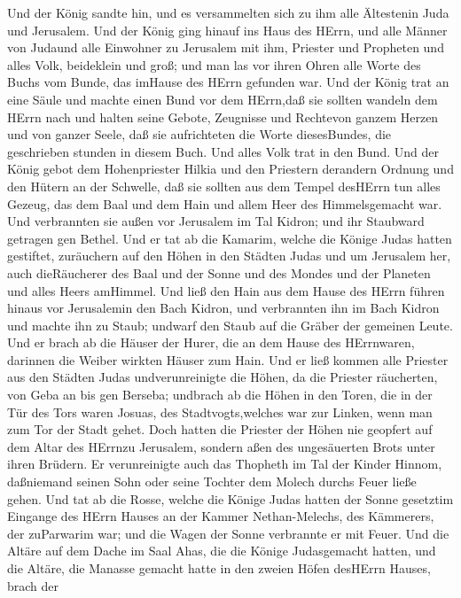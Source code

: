  Und der König sandte hin, und es versammelten sich zu ihm
alle Ältestenin Juda und Jerusalem.  Und der König ging
hinauf ins Haus des HErrn, und alle Männer von Judaund alle Einwohner zu
Jerusalem mit ihm, Priester und Propheten und alles Volk, beideklein und
groß; und man las vor ihren Ohren alle Worte des Buchs vom Bunde, das
imHause des HErrn gefunden war.  Und der König trat an eine
Säule und machte einen Bund vor dem HErrn,daß sie sollten wandeln dem
HErrn nach und halten seine Gebote, Zeugnisse und Rechtevon ganzem
Herzen und von ganzer Seele, daß sie aufrichteten die Worte
diesesBundes, die geschrieben stunden in diesem Buch. Und alles Volk
trat in den Bund.  Und der König gebot dem Hohenpriester
Hilkia und den Priestern derandern Ordnung und den Hütern an der
Schwelle, daß sie sollten aus dem Tempel desHErrn tun alles Gezeug, das
dem Baal und dem Hain und allem Heer des Himmelsgemacht war. Und
verbrannten sie außen vor Jerusalem im Tal Kidron; und ihr Staubward
getragen gen Bethel.  Und er tat ab die Kamarim, welche die
Könige Judas hatten gestiftet, zuräuchern auf den Höhen in den Städten
Judas und um Jerusalem her, auch dieRäucherer des Baal und der Sonne und
des Mondes und der Planeten und alles Heers amHimmel.  Und
ließ den Hain aus dem Hause des HErrn führen hinaus vor Jerusalemin den
Bach Kidron, und verbrannten ihn im Bach Kidron und machte ihn zu Staub;
undwarf den Staub auf die Gräber der gemeinen Leute.  Und er
brach ab die Häuser der Hurer, die an dem Hause des HErrnwaren, darinnen
die Weiber wirkten Häuser zum Hain.  Und er ließ kommen alle
Priester aus den Städten Judas undverunreinigte die Höhen, da die
Priester räucherten, von Geba an bis gen Berseba; undbrach ab die Höhen
in den Toren, die in der Tür des Tors waren Josuas, des
Stadtvogts,welches war zur Linken, wenn man zum Tor der Stadt gehet.
 Doch hatten die Priester der Höhen nie geopfert auf dem
Altar des HErrnzu Jerusalem, sondern aßen des ungesäuerten Brots unter
ihren Brüdern.  Er verunreinigte auch das Thopheth im Tal
der Kinder Hinnom, daßniemand seinen Sohn oder seine Tochter dem Molech
durchs Feuer ließe gehen.  Und tat ab die Rosse, welche die
Könige Judas hatten der Sonne gesetztim Eingange des HErrn Hauses an der
Kammer Nethan-Melechs, des Kämmerers, der zuParwarim war; und die Wagen
der Sonne verbrannte er mit Feuer.  Und die Altäre auf dem
Dache im Saal Ahas, die die Könige Judasgemacht hatten, und die Altäre,
die Manasse gemacht hatte in den zweien Höfen desHErrn Hauses, brach der
